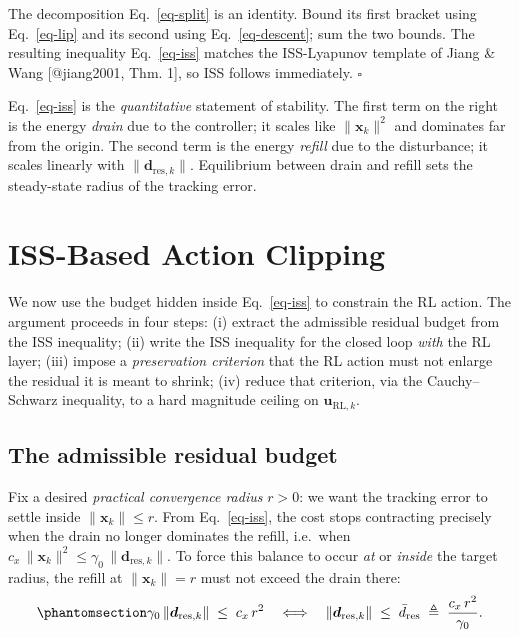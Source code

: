 \documentclass[
  11pt,
]{article}
\theoremstyle{plain}
\theoremstyle{plain}
\theoremstyle{definition}
\theoremstyle{remark}
\begin{document}
\begin{tcolorbox}[enhanced jigsaw, arc=.35mm, bottomrule=.15mm, bottomtitle=1mm, breakable, colback=white, colbacktitle=quarto-callout-note-color!10!white, colframe=quarto-callout-note-color-frame, coltitle=black, left=2mm, leftrule=.75mm, opacityback=0, opacitybacktitle=0.6, rightrule=.15mm, title=\textcolor{quarto-callout-note-color}{\faInfo}\hspace{0.5em}{Proof}, titlerule=0mm, toprule=.15mm, toptitle=1mm]

The decomposition Eq.~\ref{eq-split} is an identity. Bound its first
bracket using Eq.~\ref{eq-lip} and its second using
Eq.~\ref{eq-descent}; sum the two bounds. The resulting inequality
Eq.~\ref{eq-iss} matches the ISS-Lyapunov template of Jiang \& Wang
{[}@jiang2001, Thm. 1{]}, so ISS follows immediately. \(\square\)

\end{tcolorbox}

Eq.~\ref{eq-iss} is the \emph{quantitative} statement of stability. The
first term on the right is the energy \emph{drain} due to the
controller; it scales like \(\|\bm{x}_k\|^2\) and dominates far from the
origin. The second term is the energy \emph{refill} due to the
disturbance; it scales linearly with \(\|\bm{d}_{\mathrm{res},k}\|\).
Equilibrium between drain and refill sets the steady-state radius of the
tracking error.

\section{ISS-Based Action Clipping}\label{sec-clip}

We now use the budget hidden inside Eq.~\ref{eq-iss} to constrain the RL
action. The argument proceeds in four steps: (i) extract the admissible
residual budget from the ISS inequality; (ii) write the ISS inequality
for the closed loop \emph{with} the RL layer; (iii) impose a
\emph{preservation criterion} that the RL action must not enlarge the
residual it is meant to shrink; (iv) reduce that criterion, via the
Cauchy--Schwarz inequality, to a hard magnitude ceiling on
\(\bm{u}_{\mathrm{RL},k}\).

\subsection{The admissible residual budget}\label{sec-budget}

Fix a desired \emph{practical convergence radius} \(r > 0\): we want the
tracking error to settle inside \(\|\bm{x}_k\| \le r\). From
Eq.~\ref{eq-iss}, the cost stops contracting precisely when the drain no
longer dominates the refill, i.e.~when
\(c_x\,\|\bm{x}_k\|^2 \le \gamma_0\,\|\bm{d}_{\mathrm{res},k}\|\). To
force this balance to occur \emph{at} or \emph{inside} the target
radius, the refill at \(\|\bm{x}_k\|=r\) must not exceed the drain
there: \begin{equation}\protect\phantomsection\label{eq-budget}{
\gamma_0\,\|\bm{d}_{\mathrm{res},k}\| \;\le\; c_x\,r^2
\quad\Longleftrightarrow\quad
\|\bm{d}_{\mathrm{res},k}\| \;\le\; \bar{d}_{\mathrm{res}}
\;\triangleq\; \frac{c_x\,r^2}{\gamma_0}.
}\end{equation}
\end{document}

